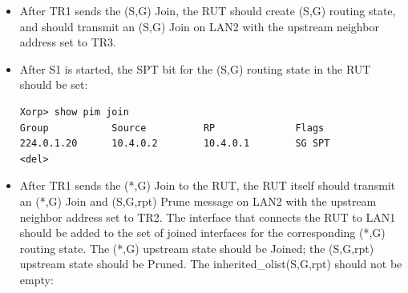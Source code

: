 \documentclass[11pt]{report}
\begin{document}
\begin{itemize}

  \item After TR1 sends the (S,G) Join, the RUT should create (S,G) routing
  state, and should transmit an (S,G) Join on LAN2 with the upstream neighbor
  address set to TR3.

  \item After S1 is started, the SPT bit for the (S,G) routing state in the
  RUT should be set:
\begin{verbatim}
Xorp> show pim join 
Group           Source          RP              Flags
224.0.1.20      10.4.0.2        10.4.0.1        SG SPT 
<del>
\end{verbatim}

  \item After TR1 sends the (*,G) Join to the RUT,
  the RUT itself should transmit an (*,G) Join and (S,G,rpt) Prune message on
  LAN2 with the upstream neighbor address set to TR2. The interface that
  connects the RUT to LAN1 should be added to the set of joined interfaces for
  the corresponding (*,G) routing state. The (*,G)
  upstream state should be Joined; the (S,G,rpt) upstream state should be
  Pruned. The inherited\_olist(S,G,rpt) should not be empty:


\end{itemize}
\end{document}

